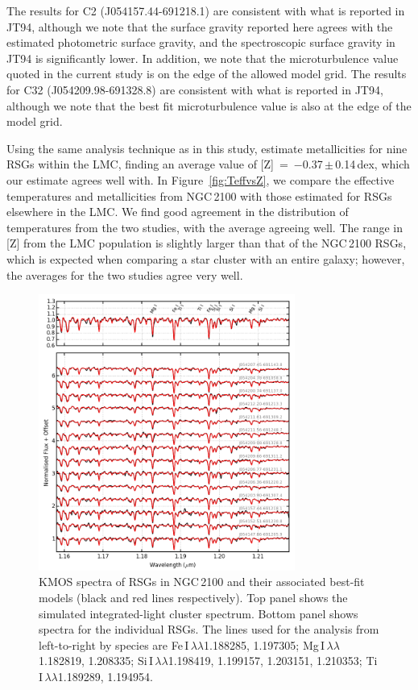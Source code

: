 \documentclass[useAMS,usenatbib]{mn2e}
\begin{document}
The results for C2 (J054157.44-691218.1) are consistent with what is reported in JT94, although we note that the surface gravity reported here agrees with the estimated photometric surface gravity, and the spectroscopic surface gravity in JT94 is significantly lower.
In addition, we note that the microturbulence value quoted in the current study is on the edge of the allowed model grid.
The results for C32 (J054209.98-691328.8) are consistent with what is reported in JT94, although we note that the best fit microturbulence value is also at the edge of the model grid.


Using the same analysis technique as in this study,
\cite{2015ApJ...806...21D} estimate metallicities for nine RSGs within the LMC,
finding an average value of [Z]~=~$-$0.37\,$\pm$\,0.14\,dex, which our estimate agrees well with.
In Figure~\ref{fig:TeffvsZ}, we compare the effective temperatures and metallicities from NGC\,2100 with those estimated for RSGs elsewhere in the LMC.
We find good agreement in the distribution of temperatures from the two studies, with the average agreeing well.
The range in [Z] from the LMC population is slightly larger than that of the NGC\,2100 RSGs, which is expected when comparing a star cluster with an entire galaxy; however, the averages for the two studies agree very well.


\begin{figure}
 \begin{center}
\includegraphics[width=0.75\textwidth]{NGC2100-model-fits}
\caption{KMOS spectra of RSGs in NGC\,2100 and their associated best-fit models
(black and red lines respectively).
Top panel shows the simulated integrated-light cluster spectrum.
Bottom panel shows spectra for the individual RSGs.
The lines used for the analysis from left-to-right by species are
Fe\,{\scriptsize I}$\,\lambda\lambda$1.188285,
1.197305;
Mg\,{\scriptsize I}$\,\lambda\lambda$1.182819,
1.208335;
Si\,{\scriptsize I}$\,\lambda\lambda$1.198419,
1.199157,
1.203151,
1.210353;
Ti\,{\scriptsize I}$\,\lambda\lambda$1.189289,
1.194954.\label{fig:model_fits}}
\end{center}
\end{figure}
\end{document}
